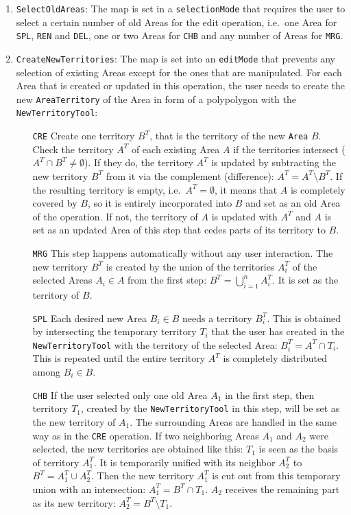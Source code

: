 \begin{enumerate}

  \item \texttt{SelectOldAreas}: The map is set in a \texttt{selectionMode} that requires the user to select a certain number of old Areas for the edit operation, i.e.\ one Area for \texttt{SPL}, \texttt{REN} and \texttt{DEL}, one or two Areas for \texttt{CHB} and any number of Areas for \texttt{MRG}.

  \item \texttt{CreateNewTerritories}: The map is set into an \texttt{editMode} that prevents any selection of existing Areas except for the ones that are manipulated. For each Area that is created or updated in this operation, the user needs to create the new \texttt{AreaTerritory} of the Area in form of a polypolygon with the \texttt{NewTerritoryTool}:
  \begin{itemize}
    \item[\texttt{CRE}]
      Create one territory $B^T$, that is the territory of the new \texttt{Area} $B$.
      Check the territory $A^T$ of each existing Area $A$ if the territories intersect ($A^T \cap B^T \neq \emptyset$).
      If they do, the territory $A^T$ is updated by subtracting the new territory $B^T$ from it via the complement (difference): $A^T = A^T \setminus B^T$.
      If the resulting territory is empty, i.e.\ $A^T = \emptyset$, it means that $A$ is completely covered by $B$, so it is entirely incorporated into $B$ and set as an old Area of the operation.
      If not, the territory of $A$ is updated with $A^T$ and $A$ is
      set as an updated Area of this step that cedes parts of its territory to $B$.
    \item[\texttt{MRG}]
      This step happens automatically without any user interaction. The new territory $B^T$ is created by the union of the territories $A^T_i$ of the selected Areas $A_i \in A$ from the first step: $B^T = \bigcup\limits_{i=1}^n A^T_i$. It is set as the territory of $B$.
    \item[\texttt{SPL}]
      Each desired new Area $B_i \in B$ needs a territory $B_i^T$. This is obtained by intersecting the temporary territory $T_i$ that the user has created in the \texttt{NewTerritoryTool} with the territory of the selected Area: $B_i^T = A^T \cap T_i$. This is repeated until the entire territory $A^T$ is completely distributed among $B_i \in B$.
    \item[\texttt{CHB}]
      If the user selected only one old Area $A_1$ in the first step, then territory $T_1$, created by the \texttt{NewTerritoryTool} in this step, will be set as the new territory of $A_1$. The surrounding Areas are handled in the same way as in the \texttt{CRE} operation. If two neighboring Areas $A_1$ and $A_2$ were selected, the new territories are obtained like this: $T_1$ is seen as the basis of territory $A_1^T$. It is temporarily unified with its neighbor $A^T_2$ to $B^T = A_1^T \cup A_2^T$. Then the new territory $A_1^T$ is cut out from this temporary union with an intersection: $A_1^T = B^T \cap T_1$. $A_2$ receives the remaining part as its new territory: $A_2^T = B^T \setminus T_1$.

\end{itemize}
\end{enumerate}

